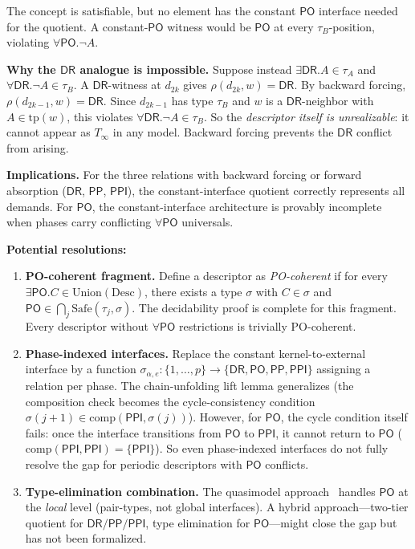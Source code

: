 \documentclass[11pt]{article}
\begin{document}
The concept is satisfiable, but no element has the constant
$\mathsf{PO}$ interface needed for the quotient.  A
constant-$\mathsf{PO}$ witness would be $\mathsf{PO}$ at every
$\tau_B$-position, violating $\forall\mathsf{PO}.\neg A$.

\medskip
\textbf{Why the $\mathsf{DR}$ analogue is impossible.}\; Suppose
instead $\exists\mathsf{DR}.A \in \tau_A$ and
$\forall\mathsf{DR}.\neg A \in \tau_B$.  A $\mathsf{DR}$-witness
at $d_{2k}$ gives $\rho(d_{2k}, w) = \mathsf{DR}$.  By backward
forcing, $\rho(d_{2k-1}, w) = \mathsf{DR}$.  Since
$d_{2k-1}$ has type $\tau_B$ and $w$ is a $\mathsf{DR}$-neighbor
with $A \in \mathrm{tp}(w)$, this violates
$\forall\mathsf{DR}.\neg A \in \tau_B$.  So the
\emph{descriptor itself is unrealizable}: it cannot appear as
$T_\infty$ in any model.  Backward forcing prevents the
$\mathsf{DR}$ conflict from arising.

\medskip
\textbf{Implications.}\; For the three relations with backward forcing
or forward absorption ($\mathsf{DR}$, $\mathsf{PP}$,
$\mathsf{PPI}$), the constant-interface quotient correctly
represents all demands.  For $\mathsf{PO}$, the constant-interface
architecture is provably incomplete when phases carry conflicting
$\forall\mathsf{PO}$ universals.

\medskip
\textbf{Potential resolutions:}
\begin{enumerate}
\item \textbf{PO-coherent fragment.}\; Define a descriptor as
  \emph{PO-coherent} if for every $\exists\mathsf{PO}.C \in
  \mathrm{Union}(\mathrm{Desc})$, there exists a type $\sigma$ with
  $C \in \sigma$ and $\mathsf{PO} \in \bigcap_j \mathrm{Safe}(\tau_j,
  \sigma)$.  The decidability proof is complete for this fragment.
  Every descriptor without $\forall\mathsf{PO}$ restrictions is
  trivially PO-coherent.
\item \textbf{Phase-indexed interfaces.}\; Replace the constant
  kernel-to-external interface by a function
  $\sigma_{\alpha,e}: \{1, \ldots, p\} \to \{\mathsf{DR},\mathsf{PO},
  \mathsf{PP},\mathsf{PPI}\}$ assigning a relation per phase.
  The chain-unfolding lift lemma generalizes (the composition check
  becomes the cycle-consistency condition
  $\sigma(j+1) \in \mathrm{comp}(\mathsf{PPI}, \sigma(j))$).
  However, for $\mathsf{PO}$, the cycle condition itself fails:
  once the interface transitions from $\mathsf{PO}$ to
  $\mathsf{PPI}$, it cannot return to $\mathsf{PO}$
  ($\mathrm{comp}(\mathsf{PPI}, \mathsf{PPI}) = \{\mathsf{PPI}\}$).
  So even phase-indexed interfaces do not fully resolve the gap for
  periodic descriptors with $\mathsf{PO}$ conflicts.
\item \textbf{Type-elimination combination.}\; The quasimodel
  approach~\cite{Claude2026} handles $\mathsf{PO}$ at the
  \emph{local} level (pair-types, not global interfaces). A hybrid
  approach---two-tier quotient for $\mathsf{DR}/\mathsf{PP}/\mathsf{PPI}$,
  type elimination for $\mathsf{PO}$---might close the gap but has
  not been formalized.
\end{enumerate}
\end{document}
